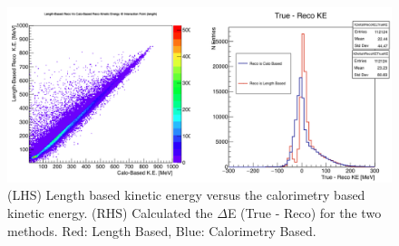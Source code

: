 \begin{figure}[htb]
\centering
\includegraphics[scale=0.38]{./images/CaloMethodsCompared.png}
\caption{(LHS) Length based kinetic energy versus the calorimetry based kinetic energy. (RHS) Calculated the $\Delta$E (True - Reco) for the two methods. Red: Length Based, Blue: Calorimetry Based. }
\label{fig:CaloMethvsLengthMeth}
\end{figure}



\newpage
